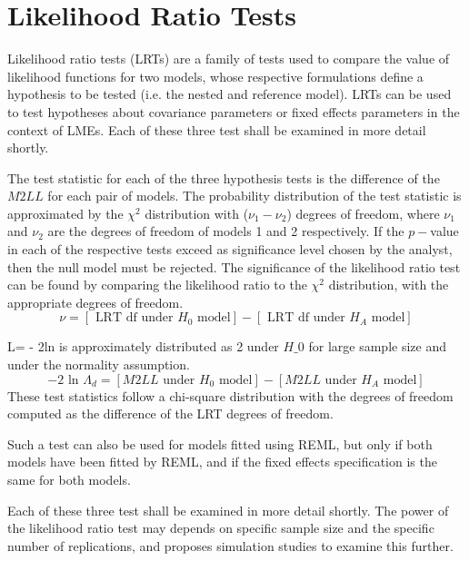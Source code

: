 \documentclass[12pt, a4paper]{report}
\theoremstyle{plain}
\theoremstyle{definition}
\theoremstyle{remark}
\begin{document}
	


	\section{Likelihood Ratio Tests}
	
	Likelihood ratio tests (LRTs) are a family of tests used to compare the value of likelihood functions for two models, whose respective formulations define a hypothesis to be tested (i.e. the nested and reference model). LRTs can be used to test hypotheses about covariance parameters or fixed effects parameters in the context of LMEs.  Each of these three test shall be examined in more detail shortly.
	
	The test statistic for each of the three hypothesis tests is the difference of the $M2LL$ for each pair of models. 	The probability distribution of the test statistic is approximated by the $\chi^2$ distribution with ($\nu_{1} - \nu_{2}$) degrees of freedom, where $\nu_{1}$ and $\nu_{2}$ are the degrees of freedom of models 1 and 2 respectively. If the $p-$value in each of the respective tests exceed as significance level chosen by the analyst, then the null model must be rejected. The significance of the likelihood ratio test can be found by comparing the likelihood ratio to the $\chi^2$ distribution, with the appropriate degrees of freedom.
	\begin{equation}
	\nu = [\mbox{ LRT df under }H_{0} \mbox{ model}] - [\mbox{ LRT df under }H_{A} \mbox{ model}]
	\end{equation}
	
	
	L= - 2ln is approximately distributed as 2 under $H\_0$ for large sample size and under the normality assumption.
	\begin{equation}
	-2\mbox{ ln }\Lambda_{d} =  [ M2LL \mbox{ under }H_{0} \mbox{ model}] - [ M2LL \mbox{ under }H_{A} \mbox{ model}]
	\end{equation}
	These test statistics follow a chi-square distribution with the degrees of freedom computed as the difference of the LRT degrees of freedom.
	

	Such a test can also be used for models fitted using REML, but only if both models have been fitted by REML, and if the fixed effects specification is the same for both models.
	
	Each of these three test shall be examined in more detail shortly.
	The power of the likelihood ratio test may depends on specific sample size and the specific number of replications, and \citet{ARoy2009} proposes simulation studies to examine this further.
\end{document}
